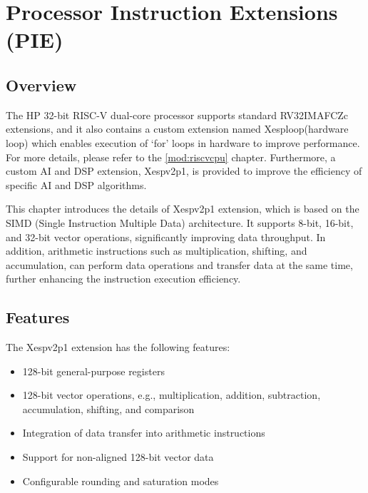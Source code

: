 \documentclass[main\_\_EN.tex]{subfiles}
\begin{document}

\ifglobal
\else
    {\let\clearpage\relax \listoftodos}
    {\let\clearpage\relax \listofdonetodos}
    \tableofcontents
\fi



\hypertarget{pie}{}
\chapter{Processor Instruction Extensions (PIE)}
\label{mod:pie}




\section{Overview}

The \chipname{} HP 32-bit RISC-V dual-core processor supports standard RV32IMAFCZc extensions, and it also contains a custom extension named Xesploop(hardware loop) which enables execution of ‘for’ loops in hardware to improve performance. For more details, please refer to the \ref{mod:riscvcpu} chapter. Furthermore, a custom AI and DSP extension, Xespv2p1, is provided to improve the efficiency of specific AI and DSP algorithms.


This chapter introduces the details of Xespv2p1 extension, which is based on the SIMD (Single Instruction Multiple Data) architecture. It supports 8-bit, 16-bit, and 32-bit vector operations, significantly improving data throughput. In addition, arithmetic instructions such as multiplication, shifting, and accumulation, can perform data operations and transfer data at the same time, further enhancing the instruction execution efficiency.

\section{Features}

The Xespv2p1 extension has the following features:

\begin{itemize}
    \item 128-bit general-purpose registers
    \item 128-bit vector operations, e.g., multiplication, addition, subtraction, accumulation, shifting, and comparison
    \item Integration of data transfer into arithmetic instructions
    \item Support for non-aligned 128-bit vector data
    \item Configurable rounding and saturation modes

\end{itemize}
\end{document}
